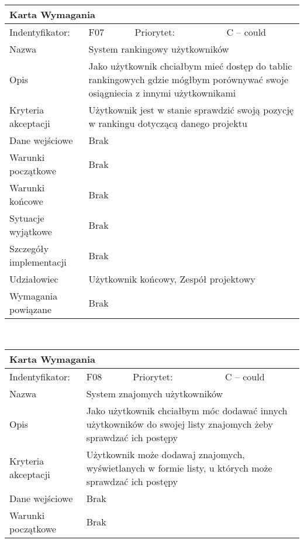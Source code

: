 \documentclass[a4paper,11pt]{report}
\begin{document}
\begin{itemize}
\begin{tabular}{|p{3cm}|p{2cm}|p{2cm}|p{6cm}|}
		\hline
		\multicolumn{4}{|p{12 cm}|}{Karta Wymagania}\\
		\hline
		Indentyfikator: & F07 & Priorytet: & C – could\\
		\hline
		Nazwa & \multicolumn{3}{|p{10 cm}|}{System rankingowy użytkowników}\\
		\hline
		Opis & \multicolumn{3}{|p{10 cm}|}{Jako użytkownik chciałbym mieć dostęp do tablic rankingowych gdzie mógłbym porównywać swoje osiągniecia z innymi użytkownikami }\\
		\hline
		Kryteria akceptacji & \multicolumn{3}{|p{10 cm}|}{Użytkownik jest w stanie sprawdzić swoją pozycję w rankingu dotyczącą danego projektu}\\
		\hline
		Dane wejściowe & \multicolumn{3}{|p{10 cm}|}{Brak}\\
		\hline
		Warunki początkowe & \multicolumn{3}{|p{10 cm}|}{Brak}\\
		\hline
		Warunki końcowe & \multicolumn{3}{|p{10 cm}|}{Brak}\\
		\hline
		Sytuacje wyjątkowe & \multicolumn{3}{|p{10 cm}|}{Brak}\\
		\hline
		Szczegóły implementacji & \multicolumn{3}{|p{10 cm}|}{Brak}\\
		\hline
		Udziałowiec & \multicolumn{3}{|p{10 cm}|}{Użytkownik końcowy, Zespół projektowy}\\
		\hline
		Wymagania powiązane & \multicolumn{3}{|p{10 cm}|}{Brak}\\
		\hline
		\end{tabular}\\
		\begin{tabular}{|p{3cm}|p{2cm}|p{2cm}|p{6cm}|}
		\hline
		\multicolumn{4}{|p{12 cm}|}{Karta Wymagania}\\
		\hline
		Indentyfikator: & F08 & Priorytet: & C – could \\
		\hline
		Nazwa & \multicolumn{3}{|p{10 cm}|}{System znajomych użytkowników}\\
		\hline
		Opis & \multicolumn{3}{|p{10 cm}|}{Jako użytkownik chciałbym móc dodawać innych użytkowników do swojej listy znajomych żeby sprawdzać ich postępy}\\
		\hline
		Kryteria akceptacji & \multicolumn{3}{|p{10 cm}|}{Użytkownik może dodawaj znajomych, wyświetlanych w formie listy, u których może sprawdzać ich postępy}\\
		\hline
		Dane wejściowe & \multicolumn{3}{|p{10 cm}|}{Brak}\\
		\hline
		Warunki początkowe & \multicolumn{3}{|p{10 cm}|}{Brak}\\

\end{tabular}
\end{itemize}
\end{document}
